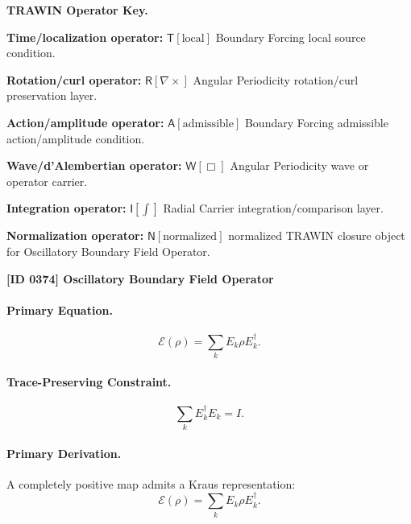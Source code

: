 \par\vspace{0.45\baselineskip}
\noindent\begin{minipage}[t]{\linewidth}
\begingroup
\small
\raggedright
\textbf{TRAWIN Operator Key.}\par
\noindent\textbf{Time/localization operator:} $\mathsf{T}\!\left[\mathrm{local}\right]$ Boundary Forcing local source condition.\par
\noindent\textbf{Rotation/curl operator:} $\mathsf{R}\!\left[\nabla\times\right]$ Angular Periodicity rotation/curl preservation layer.\par
\noindent\textbf{Action/amplitude operator:} $\mathsf{A}\!\left[\mathrm{admissible}\right]$ Boundary Forcing admissible action/amplitude condition.\par
\noindent\textbf{Wave/d'Alembertian operator:} $\mathsf{W}\!\left[\Box\right]$ Angular Periodicity wave or operator carrier.\par
\noindent\textbf{Integration operator:} $\mathsf{I}\!\left[\int\right]$ Radial Carrier integration/comparison layer.\par
\noindent\textbf{Normalization operator:} $\mathsf{N}\!\left[\mathrm{normalized}\right]$ normalized TRAWIN closure object for Oscillatory Boundary Field Operator.\par
\endgroup
\end{minipage}

\clearpage
\noindent\textbf{[ID 0374] Oscillatory Boundary Field Operator}\par
\vspace{0.35em}
\paragraph{Primary Equation.}
\begin{equation}
\mathcal{E}(\rho)=\sum_k E_k\rho E_k^\dagger .
\end{equation}

\paragraph{Trace-Preserving Constraint.}
\begin{equation}
\sum_k E_k^\dagger E_k = I .
\end{equation}

\paragraph{Primary Derivation.}
A completely positive map admits a Kraus representation:
\begin{equation}
\mathcal{E}(\rho)=\sum_k E_k\rho E_k^\dagger .
\end{equation}

